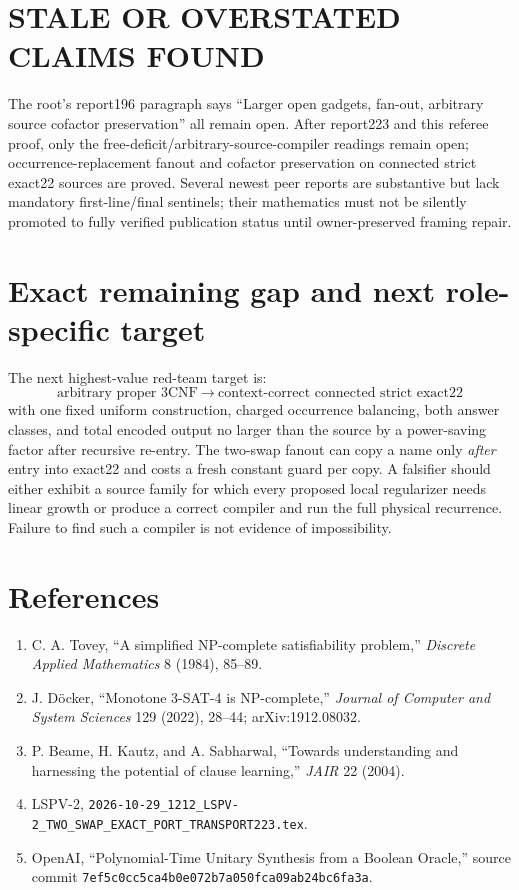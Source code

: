\documentclass[11pt]{article}
\begin{document}
\section{STALE OR OVERSTATED CLAIMS FOUND}
The root's report196 paragraph says ``Larger open gadgets, fan-out, arbitrary
source cofactor preservation'' all remain open.  After report223 and this
referee proof, only the free-deficit/arbitrary-source-compiler readings remain
open; occurrence-replacement fanout and cofactor preservation on connected
strict exact22 sources are proved.  Several newest peer reports are substantive
but lack mandatory first-line/final sentinels; their mathematics must not be
silently promoted to fully verified publication status until owner-preserved
framing repair.

\section{Exact remaining gap and next role-specific target}
The next highest-value red-team target is:
\[
\boxed{\text{arbitrary proper 3CNF}\ \longrightarrow\
\text{context-correct connected strict exact22}}
\]
with one fixed uniform construction, charged occurrence balancing, both
answer classes, and total encoded output no larger than the source by a
power-saving factor after recursive re-entry.  The two-swap fanout can copy a
name only \emph{after} entry into exact22 and costs a fresh constant guard per
copy.  A falsifier should either exhibit a source family for which every
proposed local regularizer needs linear growth or produce a correct compiler
and run the full physical recurrence.  Failure to find such a compiler is not
evidence of impossibility.

\section*{References}
\begin{enumerate}
\item C. A. Tovey, ``A simplified NP-complete satisfiability problem,''
\emph{Discrete Applied Mathematics} 8 (1984), 85--89.
\item J. D\"ocker, ``Monotone 3-SAT-4 is NP-complete,''
\emph{Journal of Computer and System Sciences} 129 (2022), 28--44;
arXiv:1912.08032.
\item P. Beame, H. Kautz, and A. Sabharwal, ``Towards understanding and
harnessing the potential of clause learning,'' \emph{JAIR} 22 (2004).
\item LSPV-2, \texttt{2026-10-29\_1212\_LSPV-2\_TWO\_SWAP\_EXACT\_PORT\_TRANSPORT223.tex}.
\item OpenAI, ``Polynomial-Time Unitary Synthesis from a Boolean Oracle,''
source commit \texttt{7ef5c0cc5ca4b0e072b7a050fca09ab24bc6fa3a}.
\end{enumerate}
\end{document}

